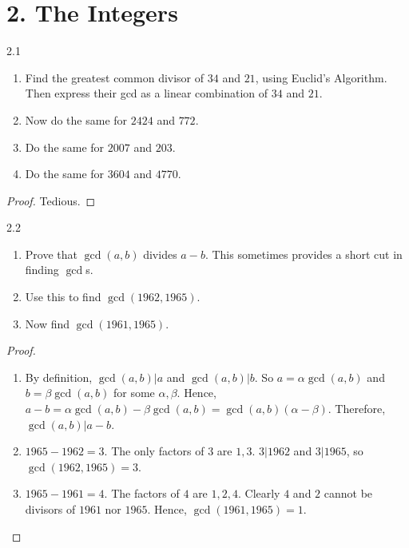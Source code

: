 \section*{2. The Integers}

\begin{exercise}{2.1}
\begin{enumerate}[label=(\alph*)]
\item Find the greatest common divisor of \(34\) and \(21\), using Euclid's Algorithm. Then express their gcd as a linear combination of \(34\) and \(21\).
\item Now do the same for \(2424\) and \(772\).
\item Do the same for \(2007\) and \(203\).
\item Do the same for \(3604\) and \(4770\).
\end{enumerate}
\end{exercise}
\begin{proof}
    Tedious.
\end{proof}

\begin{exercise}{2.2}
\begin{enumerate}[label=(\alph*)]
\item Prove that \(\gcd(a,b)\) divides \(a-b\). This sometimes provides a short cut in finding \(\gcd\)s.
\item Use this to find \(\gcd(1962, 1965)\).
\item Now find \(\gcd(1961, 1965)\).
\end{enumerate}
\end{exercise}
\begin{proof}
\begin{enumerate}[label=(\alph*)]
\item By definition, \(\gcd(a,b)|a\) and \(\gcd(a,b)|b\). So \(a = \alpha\gcd(a,b)\) and \(b = \beta\gcd(a,b)\) for some \(\alpha,\beta\).
Hence, \(a-b = \alpha\gcd(a,b) - \beta\gcd(a,b) = \gcd(a,b)(\alpha - \beta)\). Therefore, \(\gcd(a,b) | a-b\).
\item \(1965 - 1962 = 3\). The only factors of \(3\) are \(1, 3\). \(3 | 1962\) and \(3 | 1965\), so \(\gcd(1962, 1965) = 3\).
\item \(1965 - 1961 = 4\). The factors of \(4\) are \(1, 2, 4\). Clearly \(4\) and \(2\) cannot be divisors of \(1961\) nor \(1965\). Hence, \(\gcd(1961, 1965) = 1\).
\end{enumerate}
\end{proof}

